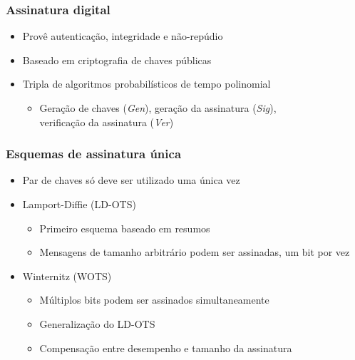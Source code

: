 \documentclass[12pt]{beamer}
\newcommand{\concat}{\, \vert \vert \,}
\begin{document}
\begin{frame}
  \frametitle{Assinatura digital}
  \begin{itemize}
    \item Provê autenticação, integridade e não-repúdio
    \item Baseado em criptografia de chaves públicas
    \item Tripla de algoritmos probabilísticos de tempo polinomial
      \cite{Goldreich:2004:FCV:975541}
    \begin{itemize}
      \item Geração de chaves (\emph{Gen}), geração da assinatura (\emph{Sig}),\\
          verificação da assinatura (\emph{Ver})
    \end{itemize}
  \end{itemize}

    \begin{figure}[h]
      \centering
    \end{figure}
\end{frame}

\begin{frame}
  \frametitle{Esquemas de assinatura única}
  \begin{itemize}
    \item Par de chaves só deve ser utilizado uma única vez
    \item Lamport-Diffie (LD-OTS)
    \begin{itemize}
      \item Primeiro esquema baseado em resumos
      \item Mensagens de tamanho arbitrário podem ser assinadas, um bit por vez
    \end{itemize}
    \item Winternitz (WOTS)
    \begin{itemize}
      \item Múltiplos bits podem ser assinados simultaneamente
      \item Generalização do LD-OTS
      \item Compensação entre desempenho e tamanho da assinatura
    \end{itemize}
  \end{itemize}
\end{frame}
\end{document}
